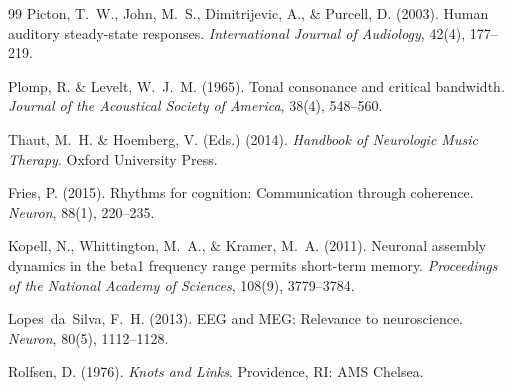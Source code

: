 \documentclass[11pt,a4paper]{article}
\begin{document}
\begin{thebibliography}{99}
Picton, T.~W., John, M.~S., Dimitrijevic, A., \& Purcell, D. (2003).
Human auditory steady-state responses.
\textit{International Journal of Audiology}, 42(4), 177--219.

Plomp, R. \& Levelt, W.~J.~M. (1965).
Tonal consonance and critical bandwidth.
\textit{Journal of the Acoustical Society of America}, 38(4), 548--560.

Thaut, M.~H. \& Hoemberg, V. (Eds.) (2014).
\textit{Handbook of Neurologic Music Therapy}.
Oxford University Press.

Fries, P. (2015).
Rhythms for cognition: Communication through coherence.
\textit{Neuron}, 88(1), 220--235.

Kopell, N., Whittington, M.~A., \& Kramer, M.~A. (2011).
Neuronal assembly dynamics in the beta1 frequency range permits
short-term memory.
\textit{Proceedings of the National Academy of Sciences}, 108(9),
3779--3784.

Lopes~da~Silva, F.~H. (2013).
EEG and MEG: Relevance to neuroscience.
\textit{Neuron}, 80(5), 1112--1128.

Rolfsen, D. (1976).
\textit{Knots and Links}.
Providence, RI: AMS Chelsea.

\end{thebibliography}
\end{document}
